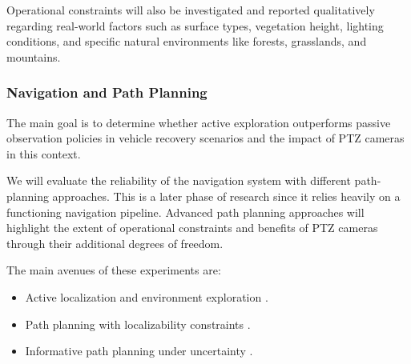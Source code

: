 \documentclass[runningheads]{llncs}
\begin{document}
Operational constraints will also be investigated and reported qualitatively regarding real-world factors such as surface types, vegetation height, lighting conditions, and specific natural environments like forests, grasslands, and mountains.

\subsubsection{Navigation and Path Planning}

The main goal is to determine whether active exploration outperforms passive observation policies in vehicle recovery scenarios and the impact of PTZ cameras in this context.

We will evaluate the reliability of the navigation system with different path-planning approaches. This is a later phase of research since it relies heavily on a functioning navigation pipeline. Advanced path planning approaches will highlight the extent of operational constraints and benefits of PTZ cameras through their additional degrees of freedom.

The main avenues of these experiments are:
\begin{itemize}
    \item Active localization and environment exploration \cite{BurgardActiveMarkovLocaliation, AutonomousRoboticExplorationGraph}.
    \item Path planning with localizability constraints \cite{LocalizabilityPathPlanning, HybridTopoMetricMaps}.
    \item Informative path planning under uncertainty \cite{InformativePathPlannin_under_uncertainty}.
\end{itemize}




\end{document}
